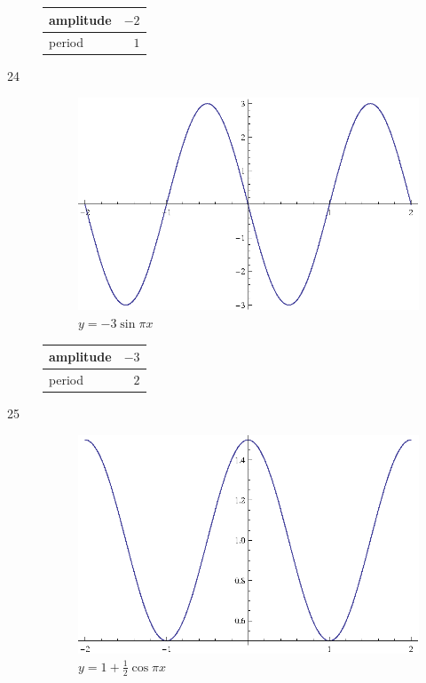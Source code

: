\documentclass{exam}
\begin{document}
\begin{description}
        \begin{tabular}[H]{lr}
          \toprule
          amplitude & $-2$ \\
          \midrule
          period & $1$ \\
          \bottomrule
        \end{tabular}

      \item[24]
        \begin{figure}[H]
          \centering
          \includegraphics[scale=0.9]{exercise24.eps}
          \caption{$y = -3 \sin \pi x$}
        \end{figure}

        \begin{tabular}[H]{lr}
          \toprule
          amplitude & $-3$ \\
          \midrule
          period & $2$ \\
          \bottomrule
        \end{tabular}

      \item[25]
        \begin{figure}[H]
          \centering
          \includegraphics[scale=0.9]{exercise25.eps}
          \caption{$y = 1 + \frac{1}{2} \cos \pi x$}
        \end{figure}


\end{description}
\end{document}
